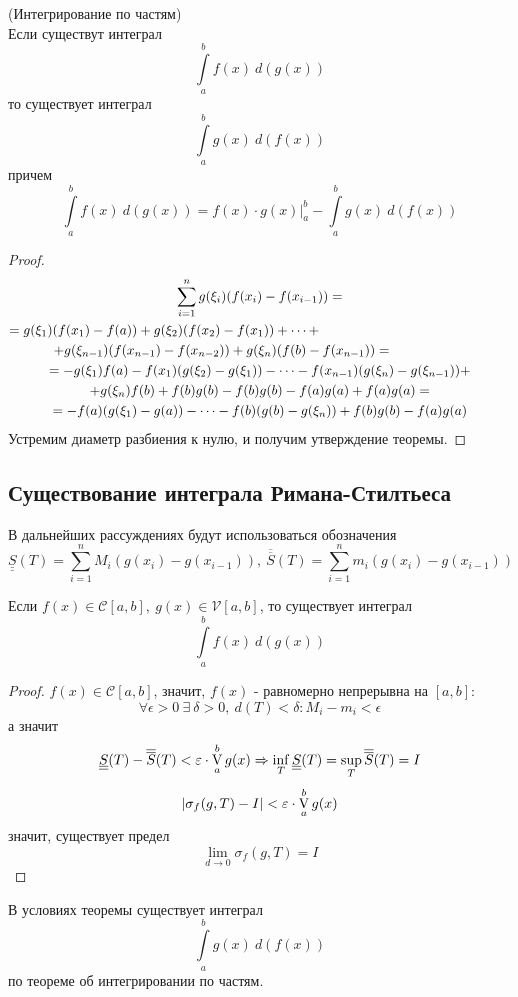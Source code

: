 \begin{numtheorem}
    (Интегрирование по частям)\\
    Если существут интеграл
    \[\int\limits_{a}^{b}f(x)\ d(g(x))\]
    то существует интеграл
    \[\int\limits_{a}^{b}g(x)\ d(f(x))\]
    причем
    \[\int\limits_{a}^{b}f(x)\ d(g(x))=f(x)\cdot g(x)|_a^b - \int\limits_{a}^{b}g(x)\ d(f(x))\]
\end{numtheorem} 
\begin{proof}
    \begin{multline*}
        \sum\limits_{i=1}^{n}g(\xi_i)(f(x_i)-f(x_{i-1}))=\\
        =g(\xi_1)(f(x_1)-f(a))+g(\xi_2)(f(x_2)-f(x_1))+\dots+\tab[5cm]\\
        +g(\xi_{n-1})(f(x_{n-1})-f(x_{n-2}))+g(\xi_{n})(f(b)-f(x_{n-1}))=\tab[2cm]\\
        =-g(\xi_1)f(a)-f(x_1)(g(\xi_2)-g(\xi_1))-\dots-f(x_{n-1})(g(\xi_n)-g(\xi_{n-1}))+\\
        +g(\xi_n)f(b)+f(b)g(b)-f(b)g(b)-f(a)g(a)+f(a)g(a)=\\ %
        =-f(a)(g(\xi_1)-g(a))-\dots-f(b)(g(b)-g(\xi_n))+f(b)g(b)-f(a)g(a)
    \end{multline*}
    Устремим диаметр разбиения к нулю, и получим утверждение теоремы.
\end{proof} 
\subsection{Существование интеграла Римана-Стилтьеса}
В дальнейших рассуждениях будут использоваться обозначения
\[\underline{\underline{S}}(T)=\sum\limits_{i=1}^{n}M_i(g(x_i)-g(x_{i-1})),\ \overline{\overline{S}}(T)=\sum\limits_{i=1}^{n}m_i(g(x_i)-g(x_{i-1}))\] 
\begin{theorem}
    Если $f(x)\in \mathcal{C}[a,b],\ g(x)\in \mathcal{V}[a,b]$, то существует интеграл
    \[\int\limits_{a}^{b}f(x)\ d(g(x))\]
\end{theorem}
\begin{proof}
    $f(x)\in \mathcal{C}[a,b]$, значит, $f(x)$ - равномерно непрерывна на $[a,b]$:
    \[\forall \epsilon>0\ \exists\ \delta>0,\ d(T)<\delta: M_i-m_i<\epsilon\]
    а значит
    \[\underline{\underline{S}}(T)-\overline{\overline{S}}(T)<\varepsilon\cdot \operatorname*{V}\limits_{a}^{b}g(x) \Rightarrow \inf\limits_T \underline{\underline{S}}(T)=\sup\limits_T \overline{\overline{S}}(T)=I\]
    \[|\sigma_f(g,T)-I|<\varepsilon\cdot \operatorname*{V}\limits_{a}^{b}g(x)\]
    значит, существует предел
    \[\lim\limits_{d\to 0}\sigma_f(g,T)=I\]
\end{proof} 
\begin{comm}
    В условиях теоремы существует интеграл
    \[\int\limits_{a}^{b} g(x)\ d(f(x))\]
    по теореме об интегрировании по частям.
\end{comm} 
